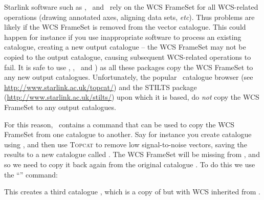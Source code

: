Starlink software such as \polpack, \Kappa\ and \gaia\ rely on the WCS
FrameSet for all WCS-related operations (drawing annotated axes, aligning
data sets, \emph{etc}). Thus problems are likely if the WCS FrameSet is
removed from the vector catalogue. This could happen for instance if you
use inappropriate software to process an existing catalogue, creating a
new output catalogue -- the WCS FrameSet may not be copied to the output
catalogue, causing subsequent WCS-related operations to fail. It is safe
to use \POLPACK, \Kappa, \GAIA\ and ) as
all these packages copy the WCS FrameSet to any new output catalogues.
Unfortunately, the popular \topcat\ catalogue browser (see
\url{http://www.starlink.ac.uk/topcat/}) and the STILTS package
(\url{http://www.starlink.ac.uk/stilts/}) upon which it is based, do
\emph{not} copy the WCS FrameSet to any output catalogues.

For this reason, \POLPACK\ contains a command that can be used to copy the
WCS FrameSet from one catalogue to another.  Say for instance you create
catalogue  using , and then use \textsc{Topcat} to remove
low signal-to-noise vectors, saving the results to a new catalogue called
. The WCS FrameSet will be missing from ,
and so we need to copy it back again from the original catalogue .
To do this we use the ``'' command:

\begin{terminalv}
\end{terminalv}

This creates a third catalogue , which is a copy of
 but with WCS inherited from .






